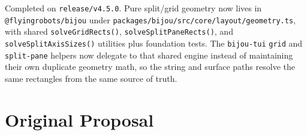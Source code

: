 Completed on \texttt{r\allowbreak{}e\allowbreak{}l\allowbreak{}e\allowbreak{}a\allowbreak{}s\allowbreak{}e\allowbreak{}/\allowbreak{}v\allowbreak{}4\allowbreak{}.\allowbreak{}5\allowbreak{}.\allowbreak{}0}. Pure split/grid geometry now lives in \texttt{@\allowbreak{}f\allowbreak{}l\allowbreak{}y\allowbreak{}i\allowbreak{}n\allowbreak{}g\allowbreak{}r\allowbreak{}o\allowbreak{}b\allowbreak{}o\allowbreak{}t\allowbreak{}s\allowbreak{}/\allowbreak{}b\allowbreak{}i\allowbreak{}j\allowbreak{}o\allowbreak{}u} under \texttt{p\allowbreak{}a\allowbreak{}c\allowbreak{}k\allowbreak{}a\allowbreak{}g\allowbreak{}e\allowbreak{}s\allowbreak{}/\allowbreak{}b\allowbreak{}i\allowbreak{}j\allowbreak{}o\allowbreak{}u\allowbreak{}/\allowbreak{}s\allowbreak{}r\allowbreak{}c\allowbreak{}/\allowbreak{}c\allowbreak{}o\allowbreak{}r\allowbreak{}e\allowbreak{}/\allowbreak{}l\allowbreak{}a\allowbreak{}y\allowbreak{}o\allowbreak{}u\allowbreak{}t\allowbreak{}/\allowbreak{}g\allowbreak{}e\allowbreak{}o\allowbreak{}m\allowbreak{}e\allowbreak{}t\allowbreak{}r\allowbreak{}y\allowbreak{}.\allowbreak{}t\allowbreak{}s}, with shared \texttt{s\allowbreak{}o\allowbreak{}l\allowbreak{}v\allowbreak{}e\allowbreak{}G\allowbreak{}r\allowbreak{}i\allowbreak{}d\allowbreak{}R\allowbreak{}e\allowbreak{}c\allowbreak{}t\allowbreak{}s\allowbreak{}(\allowbreak{})}, \texttt{s\allowbreak{}o\allowbreak{}l\allowbreak{}v\allowbreak{}e\allowbreak{}S\allowbreak{}p\allowbreak{}l\allowbreak{}i\allowbreak{}t\allowbreak{}P\allowbreak{}a\allowbreak{}n\allowbreak{}e\allowbreak{}R\allowbreak{}e\allowbreak{}c\allowbreak{}t\allowbreak{}s\allowbreak{}(\allowbreak{})}, and \texttt{s\allowbreak{}o\allowbreak{}l\allowbreak{}v\allowbreak{}e\allowbreak{}S\allowbreak{}p\allowbreak{}l\allowbreak{}i\allowbreak{}t\allowbreak{}A\allowbreak{}x\allowbreak{}i\allowbreak{}s\allowbreak{}S\allowbreak{}i\allowbreak{}z\allowbreak{}e\allowbreak{}s\allowbreak{}(\allowbreak{})} utilities plus foundation tests. The \texttt{b\allowbreak{}i\allowbreak{}j\allowbreak{}o\allowbreak{}u\allowbreak{}-\allowbreak{}t\allowbreak{}u\allowbreak{}i} \texttt{g\allowbreak{}r\allowbreak{}i\allowbreak{}d} and \texttt{s\allowbreak{}p\allowbreak{}l\allowbreak{}i\allowbreak{}t\allowbreak{}-\allowbreak{}p\allowbreak{}a\allowbreak{}n\allowbreak{}e} helpers now delegate to that shared engine instead of maintaining their own duplicate geometry math, so the string and surface paths resolve the same rectangles from the same source of truth.

\section{Original Proposal}\label{record-377-original-proposal}

